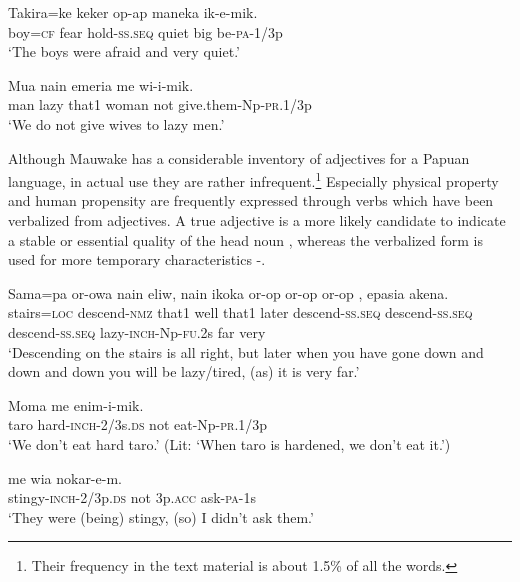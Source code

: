 \ea%
\label{ex:3:x1757}
\gll Takira=ke keker op-ap  maneka ik-e-mik. \\
boy=\textsc{cf} fear hold-\textsc{ss}.\textsc{seq} quiet big be-\textsc{pa}-1/3p\\
\glt`The boys were afraid and very quiet.'
\z

\ea%
\label{ex:3:x1418}
\gll Mua  nain emeria me wi-i-mik. \\
man lazy that1 woman not give.them-Np-\textsc{pr}.1/3p\\
\glt`We do not give wives to lazy men.'
\z

Although Mauwake has a considerable inventory of adjectives for a Papuan language, in actual use they are rather infrequent.\footnote{Their frequency in the text material is about 1.5\% of all the words.} Especially physical property and human propensity are frequently expressed through verbs which have been verbalized from adjectives. A true adjective is a more likely candidate to indicate a stable or essential quality of the head noun , whereas the verbalized form is used for more temporary characteristics -.

\ea%
\label{ex:3:x1419}
\gll Sama=pa or-owa nain eliw, nain ikoka or-op or-op or-op , epasia akena.\\
stairs=\textsc{loc} descend-\textsc{nmz} that1 well that1 later descend-\textsc{ss}.\textsc{seq} descend-\textsc{ss}.\textsc{seq} descend-\textsc{ss}.\textsc{seq} lazy-\textsc{inch}-Np-\textsc{fu}.2s far very\\
\glt`Descending on the stairs is all right, but later when you have gone down and down and down you will be lazy/tired, (as) it is very far.'
\z

\ea%
\label{ex:3:x79}
\gll Moma   me enim-i-mik. \\
taro hard-\textsc{inch}-2/3s.\textsc{ds} not eat-Np-\textsc{pr}.1/3p\\
\glt`We don't eat hard taro.' (Lit: `When taro is hardened, we don't eat it.')
\z

\ea%
\label{ex:3:x80}
\gll {} me wia nokar-e-m. \\
stingy-\textsc{inch}-2/3p.\textsc{ds} not 3p.\textsc{acc} ask-\textsc{pa}-1s\\
\glt`They were (being) stingy, (so) I didn't ask them.'
\z

